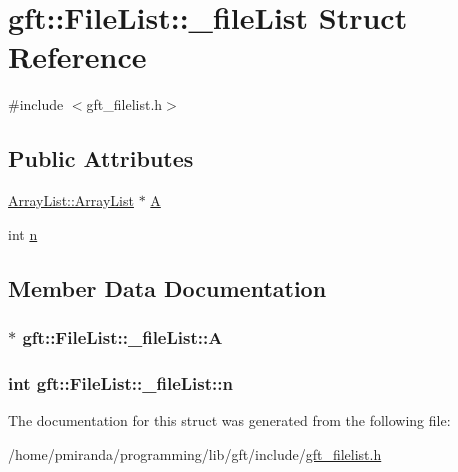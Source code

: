 \hypertarget{structgft_1_1FileList_1_1__fileList}{}\section{gft\+:\+:File\+List\+:\+:\+\_\+file\+List Struct Reference}
\label{structgft_1_1FileList_1_1__fileList}


{\ttfamily \#include $<$gft\+\_\+filelist.\+h$>$}

\subsection*{Public Attributes}
\begin{DoxyCompactItemize}
\item 
\hyperlink{namespacegft_1_1ArrayList_a597298ec8b05430a184d37236b272878}{Array\+List\+::\+Array\+List} $\ast$ \hyperlink{structgft_1_1FileList_1_1__fileList_ae64cc6d54d5ca9556ca53e337e68a99a}{A}
\item 
int \hyperlink{structgft_1_1FileList_1_1__fileList_a08e909fcc411fd4379a2b3da0692d73e}{n}
\end{DoxyCompactItemize}


\subsection{Member Data Documentation}
\subsubsection[{\texorpdfstring{A}{A}}]{$\ast$ gft\+::\+File\+List\+::\+\_\+file\+List\+::A}\hypertarget{structgft_1_1FileList_1_1__fileList_ae64cc6d54d5ca9556ca53e337e68a99a}{}\label{structgft_1_1FileList_1_1__fileList_ae64cc6d54d5ca9556ca53e337e68a99a}
\subsubsection[{\texorpdfstring{n}{n}}]{\setlength{\rightskip}{0pt plus 5cm}int gft\+::\+File\+List\+::\+\_\+file\+List\+::n}\hypertarget{structgft_1_1FileList_1_1__fileList_a08e909fcc411fd4379a2b3da0692d73e}{}\label{structgft_1_1FileList_1_1__fileList_a08e909fcc411fd4379a2b3da0692d73e}


The documentation for this struct was generated from the following file\+:\begin{DoxyCompactItemize}
\item 
/home/pmiranda/programming/lib/gft/include/\hyperlink{gft__filelist_8h}{gft\+\_\+filelist.\+h}\end{DoxyCompactItemize}
